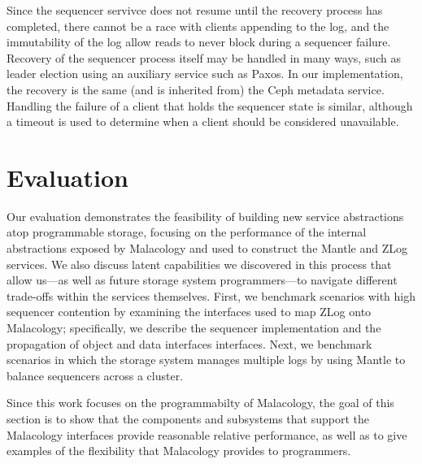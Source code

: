 \documentclass[preprint]{sigplanconf-eurosys}
\begin{document}
Since the sequencer servivce does not resume until the recovery process has
completed, there cannot be a race with clients appending to the log, and the
immutability of the log allow reads to never block during a sequencer failure.
Recovery of the sequencer process itself may be handled in many ways, such as
leader election using an auxiliary service such as Paxos. In our
implementation, the recovery is the same (and is inherited from) the Ceph
metadata service. Handling the failure of a client that holds the sequencer
state is similar, although a timeout is used to determine when a client should
be considered unavailable.

\section{Evaluation}
\label{sec:evaluation} 


Our evaluation demonstrates the feasibility of building new service abstractions
atop programmable storage, focusing on the
performance of the internal
abstractions exposed by Malacology and
used to construct the Mantle and ZLog services. We also discuss
latent capabilities we discovered in this process that allow us---as well as future
storage system programmers---to navigate
different trade-offs within the services themselves. First, we benchmark
scenarios 
with high sequencer contention
by examining the interfaces used
to map ZLog onto Malacology; specifically, we describe the sequencer
implementation and the propagation of object and data interfaces interfaces.
Next, we benchmark scenarios in which the storage system manages multiple logs by using Mantle to
balance sequencers across a cluster.


Since this work
focuses on the programmabilty of Malacology, the goal of this section is to
show that the components and subsystems that support the Malacology interfaces
provide reasonable relative performance, as well as to give examples of the flexibility
that Malacology provides to programmers.
\end{document}
